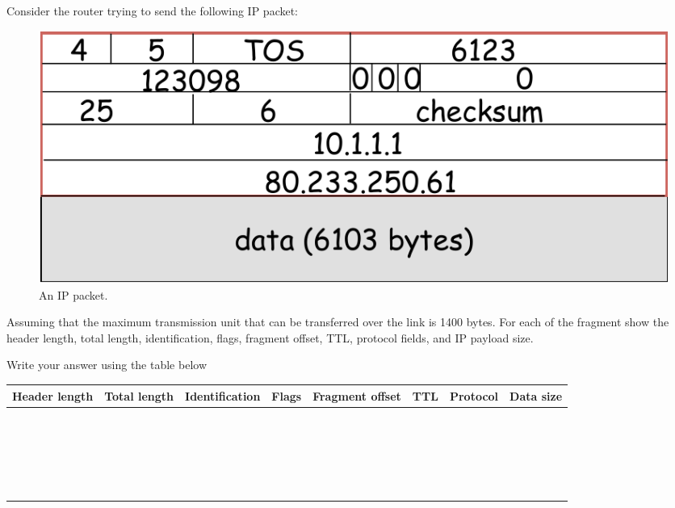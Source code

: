 \documentclass{report}
\begin{document}
\begin{problem}

Consider the router trying to send the following IP packet:

\begin{figure}[!h]
\center
\includegraphics[scale=0.8]{hw6-frag.pdf}
\caption{An IP packet.}
\label{fig:ip-frag}
\end{figure}

Assuming that the maximum transmission unit that can be transferred over the link is 1400 bytes.
For each of the fragment show the header length, total length, identification, flags, fragment offset, TTL, protocol fields, and IP payload size.



\begin{answer}{35em}
  Write your answer using the table below\\
  
  \begin{tabular}[h]{|c|c|c|c|c|c|c|c|}
  \hline
  Header length &
  Total length &
  Identification &
  Flags &
  Fragment offset &
  TTL &
  Protocol &
  Data size \\
  \hline
  & & & & & & & \\
  & & & & & & & \\
  & & & & & & & \\
  & & & & & & & \\
  & & & & & & & \\
  & & & & & & & \\
  & & & & & & & \\
  & & & & & & & \\
  & & & & & & & \\
  & & & & & & & \\
  & & & & & & & \\
  & & & & & & & \\
  & & & & & & & \\
  & & & & & & & \\
  & & & & & & & \\
  & & & & & & & \\
  & & & & & & & \\
  & & & & & & & \\
  & & & & & & & \\
  & & & & & & & \\
  & & & & & & & \\
  & & & & & & & \\
  \hline
\end{tabular}

\end{answer}

\end{problem}
\end{document}
